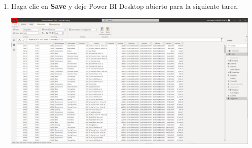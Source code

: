 \documentclass[12pt,letterpaper]{article}
\newcommand\tab[1][1cm]{\hspace*{#1}}
\begin{document}
\begin{enumerate}[\tab 1.]
\begin{center}
        \end{center}
        \item Haga clic en \textbf{Save} y deje Power BI Desktop abierto para la siguiente tarea.
        \begin{center}
            \includegraphics[width=13cm]{./img/img47.png}
        \end{center}
    \end{enumerate}
\end{document}
